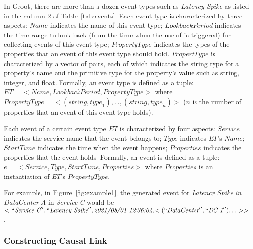 In Groot, there are more than a dozen event types such as \emph{Latency Spike} as listed in the column 2 of Table~\ref{tab:events}. 
Each event type is characterized by three aspects: $Name$ indicates the name of this event type; $Lookback Period$ %
indicates the time range to look back (from the time when the use of \system is triggered) for collecting events of this event type;  $PropertyType$ indicates the types of the properties that an event of this event type should hold. 
$PropertType$  is characterized by a vector of pairs, each of which indicates the string type for a property's name and the primitive type for the property's value such as string, integer, and float. 
Formally, an event type is defined as a tuple: 
$ET = <Name, Lookback Period, PropertyType>$ 
where 
$PropertyType = <(string, \textit{type}_1), ..., (string, \textit{type}_{n})>$ ($n$ is the number of properties that an event of this event type holds). 
%

Each event of a certain event type $ET$ is characterized by four aspects:
$\textit{Service}$ indicates the service name that the event belongs to; $\textit{Type}$ indicates $ET$'s $\textit{Name}$;  $\textit{StartTime}$ indicates the time when the event happens; $\textit{Properties}$ indicates the properties that the event  holds.
Formally, an event is defined as a tuple: 
$e = <Service, Type, StartTime, Properties>$ 
where $Properties$ is an instantiation of $ET$'s  $PropertyType$. 


%

For example, in Figure~\ref{fig:example1}, the generated event for \emph{Latency Spike in DataCenter-A} in \emph{Service-C} would be $<``\textit{Service-C}'', ``\textit{Latency\ Spike}'', \textit{2021/08/01-12:36:04}, <(``\textit{DataCenter}'',``\textit{DC-1}''),  ...>>$. %

\subsubsection{Constructing Causal Link}

